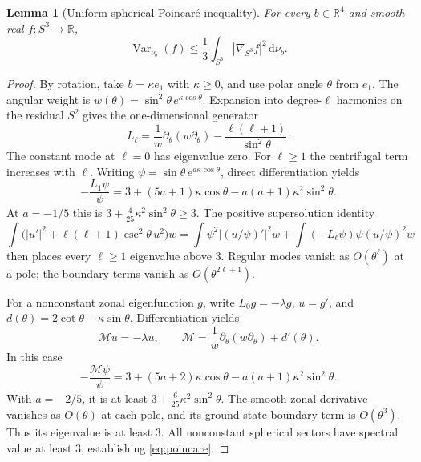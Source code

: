 \documentclass[11pt,a4paper]{article}
\numberwithin{equation}{section}
\newtheorem{lemma}[theorem]{Lemma}
\newcommand{\Var}{\operatorname{Var}}
\newcommand{\dd}{\,\mathrm d}
\begin{document}
\begin{lemma}[Uniform spherical Poincar\'e inequality]
\label{lem:poincare}
For every \(b\in\mathbb R^4\) and smooth real
\(f:S^3\to\mathbb R\),
\begin{equation}
 \Var_{\nu_b}(f)\leq\frac13
        \int_{S^3}|\nabla_{S^3}f|^2\dd\nu_b.
                                                        \label{eq:poincare}
\end{equation}
\end{lemma}
\begin{proof}
By rotation, take \(b=\kappa e_1\) with \(\kappa\geq0\), and use
polar angle \(\theta\) from \(e_1\). The angular weight is
\(w(\theta)=\sin^2\theta\,e^{\kappa\cos\theta}\).
Expansion into degree-\(\ell\) harmonics on the residual \(S^2\)
gives the one-dimensional generator
\[
 L_\ell=\frac1w\partial_\theta(w\partial_\theta)
          -\frac{\ell(\ell+1)}{\sin^2\theta}.
\]
The constant mode at \(\ell=0\) has eigenvalue zero.
For \(\ell\geq1\) the centrifugal term increases with \(\ell\).
Writing \(\psi=\sin\theta\,e^{a\kappa\cos\theta}\),
direct differentiation yields
\begin{equation}
 -\frac{L_1\psi}{\psi}
 =3+(5a+1)\kappa\cos\theta
   -a(a+1)\kappa^2\sin^2\theta.
                                                        \label{eq:barta1}
\end{equation}
At \(a=-1/5\) this is
\(3+\frac4{25}\kappa^2\sin^2\theta\geq3\).
The positive supersolution identity
\[
 \int \bigl(|u'|^2+\ell(\ell+1)
               \csc^2\theta\,u^2\bigr)w
 =\int\psi^2|(u/\psi)'|^2w
   +\int(-L_\ell\psi)\psi(u/\psi)^2w
\]
then places every \(\ell\geq1\) eigenvalue above \(3\).
Regular modes vanish as \(O(\theta^\ell)\) at a pole; the
boundary terms vanish as \(O(\theta^{2\ell+1})\).

For a nonconstant zonal eigenfunction \(g\), write
\(L_0g=-\lambda g\), \(u=g'\), and
\(d(\theta)=2\cot\theta-\kappa\sin\theta\).
Differentiation yields
\[
 \mathcal M u=-\lambda u,\qquad
 \mathcal M=\frac1w\partial_\theta(w\partial_\theta)+d'(\theta).
\]
In this case
\begin{equation}
 -\frac{\mathcal M\psi}{\psi}
 =3+(5a+2)\kappa\cos\theta
   -a(a+1)\kappa^2\sin^2\theta.
                                                        \label{eq:barta0}
\end{equation}
With \(a=-2/5\), it is at least
\(3+\frac6{25}\kappa^2\sin^2\theta\).
The smooth zonal derivative vanishes as \(O(\theta)\) at
each pole, and its ground-state boundary term is \(O(\theta^3)\).
Thus its eigenvalue is at least \(3\).
All nonconstant spherical sectors have spectral value
at least \(3\), establishing \eqref{eq:poincare}.
\end{proof}
\end{document}
